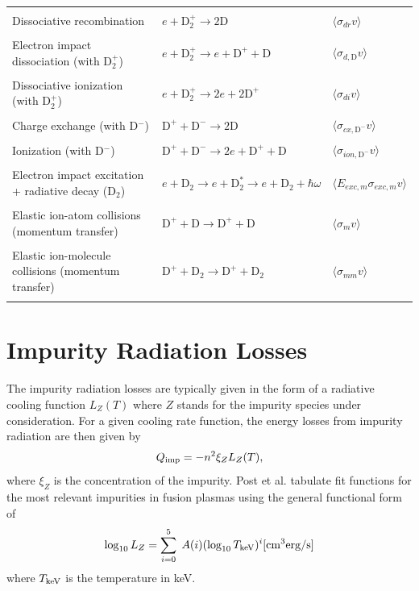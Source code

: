 \documentclass[amsmath,amssymb,a4]{revtex4-2}
\begin{document}
\begin{longtable}[c]{|l|l|l|}
 & &\\
Dissociative recombination & $e+\text{D}_2^+\rightarrow 2\text{D}$ & $\langle \sigma_{dr} v\rangle $  \\
 & &\\
Electron impact dissociation (with D$_2^+$) &  $e+\text{D}_2^+\rightarrow e + \text{D}^+ + \text{D}$ & $\langle \sigma_{d,\mathrm{D}} v\rangle $ \\
 & &\\
Dissociative ionization (with D$_2^+$) &  $e+\text{D}_2^+\rightarrow 2e + 2\text{D}^+$ & $\langle \sigma_{di} v\rangle $\\
 & &\\
Charge exchange (with D$^-$)&  $\text{D}^++\text{D}^-\rightarrow 2\text{D}$ & $\langle \sigma_{cx,\mathrm{D}^-} v\rangle $\\
 & &\\
Ionization (with D$^-$) &  $\text{D}^++\text{D}^-\rightarrow 2e + \text{D}^+ + \text{D}$ & $\langle \sigma_{ion,\mathrm{D}^-} v\rangle $ \\
 & &\\
Electron impact excitation + radiative decay (D$_2$)& $e+\mathrm{D}_2\rightarrow e + \mathrm{D}_2^* \rightarrow e+\mathrm{D}_2+ \hbar\omega$ & $\langle E_{exc,m}\sigma_{exc,m} v\rangle $ \\
 & &\\
Elastic ion-atom collisions (momentum transfer) & $\mathrm{D}^+ +\mathrm{D}\rightarrow \mathrm{D}^+ + \mathrm{D}$ & $\langle \sigma_{m} v\rangle $ \\
 & &\\
Elastic ion-molecule collisions (momentum transfer) & $\mathrm{D}^++\mathrm{D}_2\rightarrow \mathrm{D}^+ + \mathrm{D}_2$ & $\langle \sigma_{mm} v\rangle $\\
& & \hline
\end{longtable}

\newpage 
\section{Impurity Radiation Losses}

The impurity radiation losses are typically given in the form of a radiative cooling function $L_Z(T)$ where $Z$ stands for the impurity species under consideration. For a given cooling rate function, the energy losses from impurity radiation are then given by
\begin{equation}\label{impurity_radiation}
    Q_{\rm imp} = - n^2 \xi_Z L_Z(T),
\end{equation}
where $\xi_Z$ is the concentration of the impurity. Post et al.\cite{post1977} tabulate fit functions for the most relevant impurities in fusion plasmas using the general functional form of \cite{post1977}
\begin{equation}\label{cooling_rate}
    \log_{10} L_Z = \sum_{i=0}^5 \; A(i) (\log_{10} T_{\rm keV})^i [{\rm cm}^3 {\rm erg/s}]
\end{equation}
where $T_{\rm keV}$ is the temperature in keV.
\end{document}
